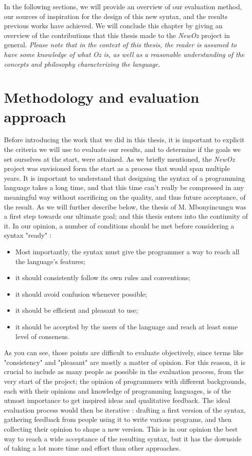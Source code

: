 In the following sections, we will provide an overview of our evaluation method, our sources of inspiration for the design of this new syntax, and the results previous works have achieved.
We will conclude this chapter by giving an overview of the contributions that this thesis made to the \textit{NewOz} project in general.
\emph{Please note that in the context of this thesis, the reader is assumed to have some knowledge of what \textit{Oz} is, as well as a reasonable understanding of the concepts and philosophy characterizing the language.}

\section{Methodology and evaluation approach}\label{sec:ch1-methodology}
Before introducing the work that we did in this thesis, it is important to explicit the criteria we will use to evaluate our results, and to determine if the goals we set ourselves at the start, were attained.
As we briefly mentioned, the \textit{NewOz} project was envisioned form the start as a process that would span multiple years.
It is important to understand that designing the syntax of a programming language takes a long time, and that this time can't really be compressed in any meaningful way without sacrificing on the quality, and thus future acceptance, of the result.
As we will further describe below, the thesis of M. Mbonyincungu was a first step towards our ultimate goal;
and this thesis enters into the continuity of it.
In our opinion, a number of conditions should be met before considering a syntax "ready" :
\begin{itemize}
    \item Most importantly, the syntax must give the programmer a way to reach all the language's features;
    \item it should consistently follow its own rules and conventions;
    \item it should avoid confusion whenever possible;
    \item it should be efficient and pleasant to use;
    \item it should be accepted by the users of the language and reach at least some level of consensus.
\end{itemize}
As you can see, those points are difficult to evaluate objectively, since terms like "consistency" and "pleasant" are mostly a matter of opinion.
For this reason, it is crucial to include as many people as possible in the evaluation process, from the very start of the project;
the opinion of programmers with different backgrounds, each with their opinions and knowledge of programming languages, is of the utmost importance to get inspired ideas and qualitative feedback.
The ideal evaluation process would then be iterative : drafting a first version of the syntax, gathering feedback from people using it to write various programs, and then collecting their opinion to shape a new version.
This is in our opinion the best way to reach a wide acceptance of the resulting syntax, but it has the downside of taking a lot more time and effort than other approaches.\newline

